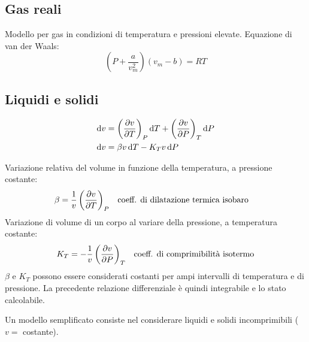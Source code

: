 \subsection{Gas reali}
Modello per gas in condizioni di temperatura e pressioni elevate. Equazione di van der Waals:
\[\left(P + \frac{a}{v_m^2}\right)(v_m-b) = RT\]

\subsection{Liquidi e solidi}
\begin{align*}
    \dd{v} &= \left(\pdv{v}{T}\right)_P \dd{T} + \left(\pdv{v}{P}\right)_T \dd{P} \\
    \dd{v} &= \beta v \dd{T} - K_T v \dd{P}
\end{align*}

Variazione relativa del volume in funzione della temperatura, a pressione costante:
\begin{align*}
    \beta = \frac{1}{v} \left(\pdv{v}{T}\right)_P & \quad \text{coeff. di dilatazione termica isobaro}
\end{align*}
Variazione di volume di un corpo al variare della pressione, a temperatura costante:
\begin{align*}
    K_T = -\frac{1}{v} \left(\pdv{v}{P}\right)_T & \quad \text{coeff. di comprimibilità isotermo} \\
\end{align*}
$\beta$ e $K_T$ possono essere considerati costanti per ampi intervalli di temperatura e di pressione. La precedente relazione differenziale è quindi integrabile e lo stato calcolabile. 

Un modello semplificato consiste nel considerare liquidi e solidi incomprimibili ($v =$ costante).